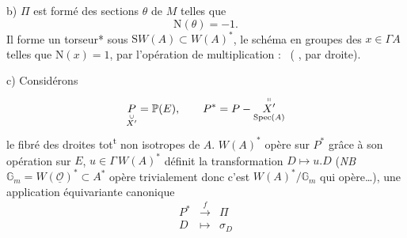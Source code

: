 \documentclass[11pt,a4paper]{article}
\begin{document}
b) $\Pi$ est formé des sections $\theta$ de $M$ telles que
\[
  \mathrm{N}(\theta) = -1 .
\]
Il forme un torseur* sous $\mathrm{S}W(A) \subset W(A)^{*}$, le  schéma en groupes des $x \in \Gamma A$ telles que $\mathrm{N}(x) = 1$, par l'opération de multiplication : \ (  , par   droite).


c) Considérons
\[
  \underset{\overset{\cup}{X'}}{P} = \mathbb{P}(E), \qquad P^{*} = P - \underset{\mathrm{Spec}(A)}{\overset{\shortparallel}{X'}}
\]
le fibré des droites tot\textsuperscript{t} non isotropes de $A$. $W(A)^{*}$ opère sur $P^{*}$ grâce à son opération sur $E$,  $u \in \Gamma\, W(A)^{*}$ définit la transformation $D \mapsto u.D$ (\emph{NB} $\mathbb{G}_m = W(\underline{\mathcal{O}})^{*} \subset A^{*}$ opère trivialement donc c'est $W(A)^{*}/\mathbb{G}_m$ qui opère…),   une application équivariante canonique
\[
  \begin{array}{rcl}
    P^{*} & \xrightarrow{f} & \Pi \\
    D & \longmapsto & \sigma_D
  \end{array}
\]
\end{document}
